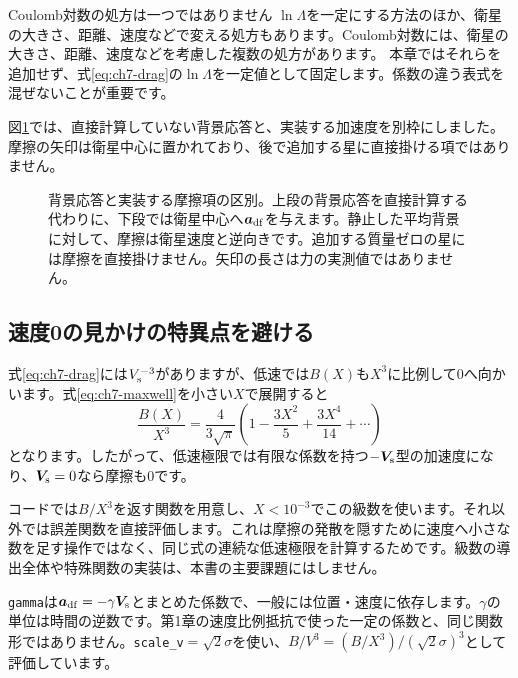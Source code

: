 \begin{notebox}{Coulomb対数の処方は一つではありません}
$\ln\Lambda$を一定にする方法のほか、衛星の大きさ、距離、速度などで変える処方もあります。Coulomb対数には、衛星の大きさ、距離、速度などを考慮した複数の処方があります。\cite{bt2008} 本章ではそれらを追加せず、式\eqref{eq:ch7-drag}の$\ln\Lambda$を一定値として固定します。係数の違う表式を混ぜないことが重要です。
\end{notebox}


図\ref{fig:concept-ch7-friction}では、直接計算していない背景応答と、実装する加速度を別枠にしました。摩擦の矢印は衛星中心に置かれており、後で追加する星に直接掛ける項ではありません。
\begin{figure}[!htbp]
\centering

\caption{背景応答と実装する摩擦項の区別。上段の背景応答を直接計算する代わりに、下段では衛星中心へ$\boldsymbol a_{\rm df}$を与えます。静止した平均背景に対して、摩擦は衛星速度と逆向きです。追加する質量ゼロの星には摩擦を直接掛けません。矢印の長さは力の実測値ではありません。}
\label{fig:concept-ch7-friction}
\end{figure}
\FloatBarrier

\subsection{速度0の見かけの特異点を避ける}
式\eqref{eq:ch7-drag}には$V_{\rm s}^{-3}$がありますが、低速では$B(X)$も$X^3$に比例して0へ向かいます。式\eqref{eq:ch7-maxwell}を小さい$X$で展開すると
\begin{equation}
 \frac{B(X)}{X^3}
 =\frac{4}{3\sqrt{\pi}}\left(1-\frac{3X^2}{5}+\frac{3X^4}{14}+\cdots\right)
 \label{eq:ch7-small-x}
\end{equation}
となります。したがって、低速極限では有限な係数を持つ$-\boldsymbol V_{\rm s}$型の加速度になり、$\boldsymbol V_{\rm s}=0$なら摩擦も0です。

コードでは$B/X^3$を返す関数を用意し、$X<10^{-3}$でこの級数を使います。それ以外では誤差関数を直接評価します。これは摩擦の発散を隠すために速度へ小さな数を足す操作ではなく、同じ式の連続な低速極限を計算するためです。級数の導出全体や特殊関数の実装は、本書の主要課題にはしません。

\texttt{gamma}は$\boldsymbol a_{\rm df}=-\gamma\boldsymbol V_{\rm s}$とまとめた係数で、一般には位置・速度に依存します。$\gamma$の単位は時間の逆数です。第1章の速度比例抵抗で使った一定の係数と、同じ関数形ではありません。\texttt{scale\_v}$=\sqrt2\sigma$を使い、$B/V^3=(B/X^3)/(\sqrt2\sigma)^3$として評価しています。

